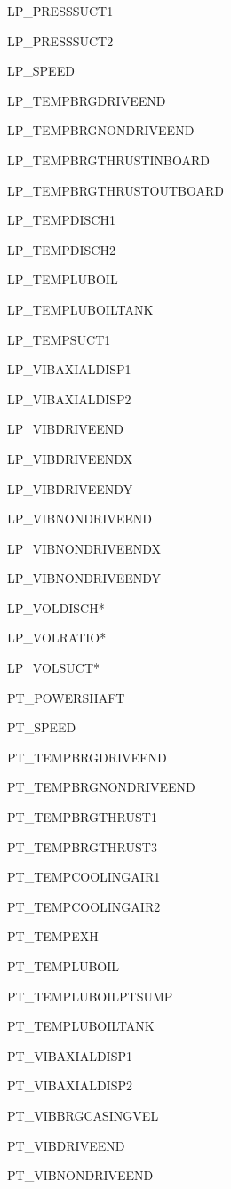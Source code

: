 \documentclass[11pt]{article} %
\theoremstyle{plain}
\theoremstyle{definition}
\begin{document}
\begin{appendices}
\begin{multicols}{2}
\begin{enumerate}
{\item LP\_PRESSSUCT1
\item LP\_PRESSSUCT2
\item LP\_SPEED
\item LP\_TEMPBRGDRIVEEND
\item LP\_TEMPBRGNONDRIVEEND
\item LP\_TEMPBRGTHRUSTINBOARD
\item LP\_TEMPBRGTHRUSTOUTBOARD
\item LP\_TEMPDISCH1
\item LP\_TEMPDISCH2
\item LP\_TEMPLUBOIL
\item LP\_TEMPLUBOILTANK
\item LP\_TEMPSUCT1
\item LP\_VIBAXIALDISP1
\item LP\_VIBAXIALDISP2
\item LP\_VIBDRIVEEND
\item LP\_VIBDRIVEENDX
\item LP\_VIBDRIVEENDY
\item LP\_VIBNONDRIVEEND
\item LP\_VIBNONDRIVEENDX
\item LP\_VIBNONDRIVEENDY
\item LP\_VOLDISCH*
\item LP\_VOLRATIO*
\item LP\_VOLSUCT*
\item PT\_POWERSHAFT
\item PT\_SPEED
\item PT\_TEMPBRGDRIVEEND
\item PT\_TEMPBRGNONDRIVEEND
\item PT\_TEMPBRGTHRUST1
\item PT\_TEMPBRGTHRUST3
\item PT\_TEMPCOOLINGAIR1
\item PT\_TEMPCOOLINGAIR2
\item PT\_TEMPEXH
\item PT\_TEMPLUBOIL
\item PT\_TEMPLUBOILPTSUMP
\item PT\_TEMPLUBOILTANK
\item PT\_VIBAXIALDISP1
\item PT\_VIBAXIALDISP2
\item PT\_VIBBRGCASINGVEL
\item PT\_VIBDRIVEEND
\item PT\_VIBNONDRIVEEND
}
	\end{enumerate}
\end{multicols}


\end{appendices}
\end{document}
